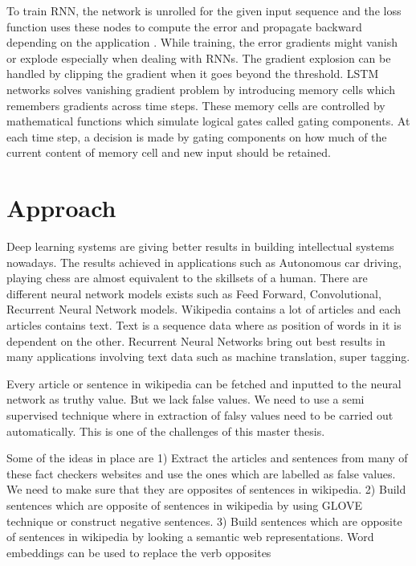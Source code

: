 \documentclass[a4paper, 11pt]{article}
\begin{document}
To train RNN, the network is unrolled for the given input sequence and the loss function uses these nodes to compute the error and propagate backward depending on the application \cite{Werbos1990}. While training, the error gradients might vanish or explode especially when dealing with RNNs. The gradient explosion can be handled by clipping the gradient when it goes beyond the threshold. LSTM networks \cite{Hochreiter1997} solves vanishing gradient problem by introducing memory cells which remembers gradients across time steps. These memory cells are controlled by mathematical functions which simulate logical gates called gating components. At each time step, a decision is made by gating components on how much of the current content of memory cell and new input should be retained. 


\section{Approach}

Deep learning systems are giving better results in building intellectual systems nowadays.\cite{Goldberg2016} The results achieved in applications such as Autonomous car driving, playing chess are almost equivalent to the skillsets of a human. There are different neural network models exists such as Feed Forward, Convolutional, Recurrent Neural Network models. Wikipedia contains a lot of articles and each articles contains text. Text is a sequence data where as position of words in it is dependent on the other. Recurrent Neural Networks bring out best results in many applications involving text data such as machine translation, super tagging.

Every article or sentence in wikipedia can be fetched and inputted to the neural network as truthy value. But we lack false values. We need to use a semi supervised technique where in extraction of falsy values need to be carried out automatically. This is one of the challenges of this master thesis. 

Some of the ideas in place are
1) Extract the articles and sentences from many of these fact checkers websites and use the ones which are labelled as false values. We need to make sure that they are opposites of sentences in wikipedia.
2) Build sentences which are opposite of sentences in wikipedia by using GLOVE technique or construct negative sentences. 
3) Build sentences which are opposite of sentences in wikipedia by looking a semantic web representations. Word embeddings can be used to replace the verb opposites 
\end{document}
